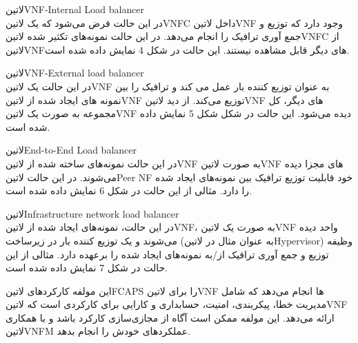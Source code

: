 \documentclass{book}
\begin{document}

 ‌لاتین{VNF-Internal Load balancer}\\
در این حالت فرض می‌شود که یک ‌لاتین{VNFC} داخل ‌لاتین{VNF} وجود دارد که توزیع و جمع آوری ترافیک را انجام می‌دهد.
در این حالت نمونه‌های تکثیر شده ‌لاتین{VNFC} از ‌لاتین{VNF}های دیگر قابل مشاهده نیستند. این حالت در شکل 4 نمایش داده شده است.

 ‌لاتین{VNF-External load balancer}\\
در این حالت یک ‌لاتین{VNF} به عنوان توزیع کننده بار عمل می کند و ترافیک را بین نمونه های ایجاد شده از ‌لاتین{VNF} توزیع می‌کند.
از دید ‌لاتین{VNF} های دیگر، کل مجموعه به صورت یک ‌لاتین{VNF} دیده می‌شود. این حالت در شکل شکل 5 نمایش داده شده است.

 ‌لاتین{End-to-End Load balancer}\\
در این حالت نمونه‌های ساخته شده از ‌لاتین{VNF} به صورت ‌لاتین{VNF} های مجزا دیده می‌شوند.
در این حالت ‌لاتین{Peer NF} خود قابلیت توزیع ترافیک بین نمونه‌های ایجاد شده را دارد. مثالی از این حالت در شکل 6 نمایش داده شده است.

 ‌لاتین{Infrastructure network load balancer}\\
در این حالت، نمونه‌های ایجاد شده از ‌لاتین{VNF}، به صورت یک ‌لاتین{VNF} واحد دیده می‌شوند
و یک توزیع کننده بار در زیرساخت (به عنوان مثال در ‌لاتین{Hypervisor}) وظیفه توزیع و جمع آوری ترافیک از/به نمونه‌های ایجاد شده را برعهده دارد.
مثالی از این حالت در شکل 7 نمایش داده شده است.



این مولفه کارکردهای ‌لاتین{FCAPS}
را برای ‌لاتین{VNF} ها انجام می‌دهد که شامل مدیریت خطا، پیکربندی، امنیت، حسابداری و کارایی برای کارکردی است که ‌لاتین{VNF} ارائه می‌دهد.
این مولفه ممکن است آگاه از مجازی‌سازی کارکرد باشد و با همکاری ‌لاتین{VNFM} عملکردهای خودش را انجام بدهد.
\end{document}
